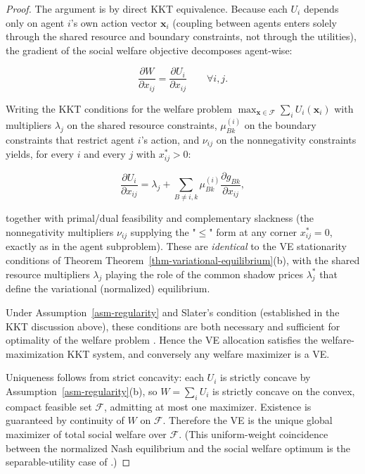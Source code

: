 \documentclass[11pt]{article}
\theoremstyle{plain}
\theoremstyle{definition}
\theoremstyle{remark}
\begin{document}
\begin{proof}
The argument is by direct KKT equivalence. Because each $U_i$ depends only on agent $i$'s own action vector $\mathbf{x}_i$ (coupling between agents enters solely through the shared resource and boundary constraints, not through the utilities), the gradient of the social welfare objective decomposes agent-wise:

$$\frac{\partial W}{\partial x_{ij}} = \frac{\partial U_i}{\partial x_{ij}} \qquad \forall i, j.$$

Writing the KKT conditions for the welfare problem $\max_{\mathbf{x} \in \mathcal{F}} \sum_i U_i(\mathbf{x}_i)$ with multipliers $\lambda_j$ on the shared resource constraints, $\mu_{Bk}^{(i)}$ on the boundary constraints that restrict agent $i$'s action, and $\nu_{ij}$ on the nonnegativity constraints yields, for every $i$ and every $j$ with $x_{ij}^* > 0$:

$$\frac{\partial U_i}{\partial x_{ij}} = \lambda_j + \sum_{B \neq i, k} \mu_{Bk}^{(i)} \frac{\partial g_{Bk}}{\partial x_{ij}},$$

together with primal/dual feasibility and complementary slackness (the nonnegativity multipliers $\nu_{ij}$ supplying the "$\leq$" form at any corner $x_{ij}^* = 0$, exactly as in the agent subproblem). These are \emph{identical} to the VE stationarity conditions of Theorem Theorem~\ref{thm-variational-equilibrium}(b), with the shared resource multipliers $\lambda_j$ playing the role of the common shadow prices $\lambda_j^*$ that define the variational (normalized) equilibrium.

Under Assumption~\ref{asm-regularity} and Slater's condition (established in the KKT discussion above), these conditions are both necessary and sufficient for optimality of the welfare problem \citep[§5.5.3]{Boyd2004}. Hence the VE allocation satisfies the welfare-maximization KKT system, and conversely any welfare maximizer is a VE.

Uniqueness follows from strict concavity: each $U_i$ is strictly concave by Assumption~\ref{asm-regularity}(b), so $W = \sum_i U_i$ is strictly concave on the convex, compact feasible set $\mathcal{F}$, admitting at most one maximizer. Existence is guaranteed by continuity of $W$ on $\mathcal{F}$. Therefore the VE is the unique global maximizer of total social welfare over $\mathcal{F}$. (This uniform-weight coincidence between the normalized Nash equilibrium and the social welfare optimum is the separable-utility case of \citep[§5]{Rosen1965}.)
\end{proof}
\end{document}
